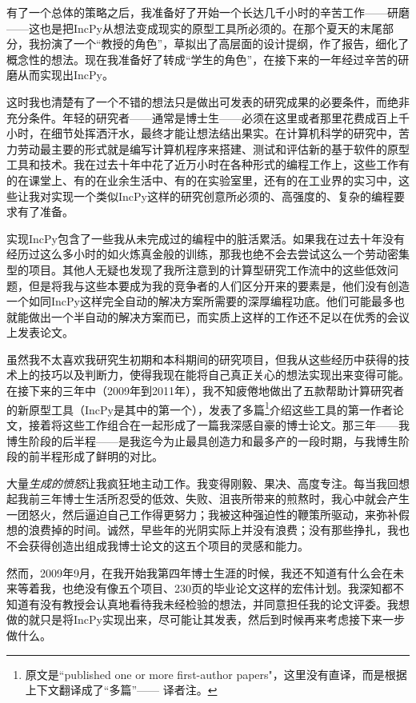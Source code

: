 \documentclass[letter,12pt]{book}
\begin{document}
\begin{CJK}{UTF8}{gbsn}
有了一个总体的策略之后，我准备好了开始一个长达几千小时的辛苦工作——研磨——这也是把IncPy从想法变成现实的原型工具所必须的。在那个夏天的末尾部分，我扮演了一个“教授的角色”，草拟出了高层面的设计提纲，作了报告，细化了概念性的想法。现在我准备好了转成“学生的角色”，在接下来的一年经过辛苦的研磨从而实现出IncPy。

\breakline

这时我也清楚有了一个不错的想法只是做出可发表的研究成果的必要条件，而绝非充分条件。年轻的研究者——通常是博士生——必须在这里或者那里花费成百上千小时，在细节处挥洒汗水，最终才能让想法结出果实。在计算机科学的研究中，苦力劳动最主要的形式就是编写计算机程序来搭建、测试和评估新的基于软件的原型工具和技术。我在过去十年中花了近万小时在各种形式的编程工作上，这些工作有的在课堂上、有的在业余生活中、有的在实验室里，还有的在工业界的实习中，这些让我对实现一个类似IncPy这样的研究创意所必须的、高强度的、复杂的编程要求有了准备。

实现IncPy包含了一些我从未完成过的编程中的脏活累活。如果我在过去十年没有经历过这么多小时的如火炼真金般的训练，那我也绝不会去尝试这么一个劳动密集型的项目。其他人无疑也发现了我所注意到的计算型研究工作流中的这些低效问题，但是将我与这些本要成为我的竞争者的人们区分开来的要素是，他们没有创造一个如同IncPy这样完全自动的解决方案所需要的深厚编程功底。他们可能最多也就能做出一个半自动的解决方案而已，而实质上这样的工作还不足以在优秀的会议上发表论文。

虽然我不太喜欢我研究生初期和本科期间的研究项目，但我从这些经历中获得的技术上的技巧以及判断力，使得我现在能将自己真正关心的想法实现出来变得可能。在接下来的三年中（2009年到2011年），我不知疲倦地做出了五款帮助计算研究者的新原型工具（IncPy是其中的第一个），发表了多篇\footnote{原文是``published one or more first-author papers"，这里没有直译，而是根据上下文翻译成了“多篇”—— 译者注。}介绍这些工具的第一作者论文，接着将这些工作组合在一起形成了一篇我深感自豪的博士论文。那三年——我博生阶段的后半程——是我迄今为止最具创造力和最多产的一段时期，与我博生阶段的前半程形成了鲜明的对比。

大量\emph{生成的愤怒}让我疯狂地主动工作。我变得刚毅、果决、高度专注。每当我回想起我前三年博士生活所忍受的低效、失败、沮丧所带来的煎熬时，我心中就会产生一团怒火，然后逼迫自己工作得更努力；我被这种强迫性的鞭策所驱动，来弥补假想的浪费掉的时间。诚然，早些年的光阴实际上并没有浪费；没有那些挣扎，我也不会获得创造出组成我博士论文的这五个项目的灵感和能力。

\breakline

然而，2009年9月，在我开始我第四年博士生涯的时候，我还不知道有什么会在未来等着我，也绝没有像五个项目、230页的毕业论文这样的宏伟计划。我深知都不知道有没有教授会认真地看待我未经检验的想法，并同意担任我的论文评委。我想做的就只是将IncPy实现出来，尽可能让其发表，然后到时候再来考虑接下来一步做什么。


\end{CJK}
\end{document}
